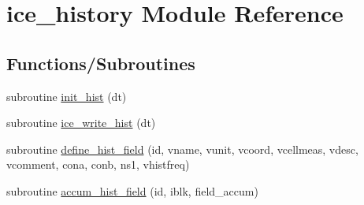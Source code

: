 \hypertarget{namespaceice__history}{
\section{ice\_\-history Module Reference}
\label{namespaceice__history}
}
\subsection*{Functions/Subroutines}
\begin{DoxyCompactItemize}
\item 
subroutine \hyperlink{namespaceice__history_a99fbe7f0b61b42e909dad8bfff950536}{init\_\-hist} (dt)
\item 
subroutine \hyperlink{namespaceice__history_a09981e8df56a439fdddc4fcbb1066ecd}{ice\_\-write\_\-hist} (dt)
\item 
subroutine \hyperlink{namespaceice__history_a97e4c9d297248bf62ca51169bf82a846}{define\_\-hist\_\-field} (id, vname, vunit, vcoord, vcellmeas, vdesc, vcomment, cona, conb, ns1, vhistfreq)
\item 
subroutine \hyperlink{namespaceice__history_a16cf4059a24eed8a2908cecdba018383}{accum\_\-hist\_\-field} (id, iblk, field\_\-accum)
\end{DoxyCompactItemize}
